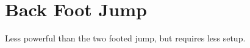 \section{Back Foot Jump}
\label{sec:jumping/back_foot}


Less powerful than the two footed jump, but requires less setup.




